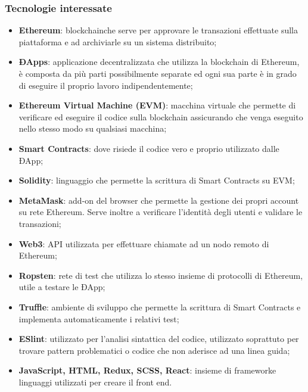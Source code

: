 \subsubsection{Tecnologie interessate}
\begin{itemize}
	\item \textbf{Ethereum}\glo: blockchain\glosp che serve per approvare le transazioni effettuate sulla piattaforma e ad archiviarle su un sistema distribuito; 
	\item \textbf{ÐApps}\glo: applicazione decentralizzata che utilizza la blockchain di Ethereum, è composta da più parti possibilmente separate ed ogni sua parte è in grado di eseguire il proprio lavoro indipendentemente; 
	\item \textbf{Ethereum Virtual Machine (EVM)}\glo: macchina virtuale che permette di verificare ed eseguire il codice sulla blockchain assicurando che venga eseguito nello stesso modo su qualsiasi macchina;
	\item \textbf{Smart Contracts}\glo: dove risiede il codice vero e proprio utilizzato dalle ÐApp;
	\item \textbf{Solidity}: linguaggio che permette la scrittura di Smart Contracts su EVM;
	\item \textbf{MetaMask}\glo: add-on del browser che permette la gestione dei propri account su rete Ethereum. Serve inoltre a verificare l'identità degli utenti e validare le transazioni;
	\item \textbf{Web3}: API utilizzata per effettuare chiamate ad un nodo remoto di Ethereum;
	\item\textbf{Ropsten}: rete di test che utilizza lo stesso insieme di protocolli di Ethereum, utile a testare le ÐApp;
	\item\textbf{Truffle}: ambiente di sviluppo che permette la scrittura di Smart Contracts e implementa automaticamente i relativi test;
	\item\textbf{ESlint}: utilizzato per l'analisi sintattica del codice, utilizzato soprattuto per trovare pattern problematici o codice che non aderisce ad una linea guida;
	\item \textbf{JavaScript, HTML, Redux\glo, SCSS\glo, React\glo}: insieme di framework\glosp e linguaggi utilizzati per creare il front end.
\end{itemize}

